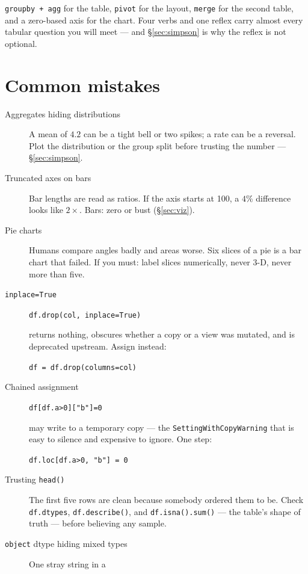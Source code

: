 \begin{wins}
\texttt{groupby + agg} for the table, \texttt{pivot} for the layout,
\texttt{merge} for the second table, and a zero-based axis for the chart.
Four verbs and one reflex carry almost every tabular question you will meet
--- and \S\ref{sec:simpson} is why the reflex is not optional.
\end{wins}

\section{Common mistakes}\label{sec:cm}

\begin{description}
\item[Aggregates hiding distributions] A mean of $4.2$ can be a tight bell
  or two spikes; a rate can be a reversal. Plot the distribution or the
  group split before trusting the number --- \S\ref{sec:simpson}.
\item[Truncated axes on bars] Bar lengths are read as ratios. If the axis
  starts at 100, a $4\%$ difference looks like $2\times$. Bars: zero or bust
  (\S\ref{sec:viz}).
\item[Pie charts] Humans compare angles badly and areas worse. Six slices
  of a pie is a bar chart that failed. If you must: label slices
  numerically, never 3-D, never more than five.
\item[\texttt{inplace=True}] \par\texttt{df.drop(col, inplace=True)}
  \par\noindent returns nothing, obscures whether a copy or a view was
  mutated, and is deprecated upstream. Assign instead:
  \par\texttt{df = df.drop(columns=col)}
\item[Chained assignment] \par\texttt{df[df.a>0]["b"]=0}
  \par\noindent may write to a temporary copy --- the
  \texttt{SettingWithCopyWarning} that is easy to silence and expensive
  to ignore. One step: \par\texttt{df.loc[df.a>0, "b"] = 0}
\item[Trusting \texttt{head()}] The first five rows are clean because
  somebody ordered them to be. Check \texttt{df.dtypes},
  \texttt{df.describe()}, and \texttt{df.isna().sum()} --- the table's
  shape of truth --- before believing any sample.
\item[\texttt{object} dtype hiding mixed types] One stray string in a

\end{description}
